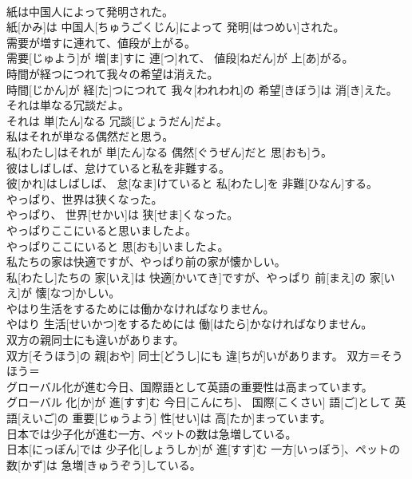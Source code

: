 \documentclass[8pt]{extreport}
\begin{document}
\begin{CJK}{UTF8}{min}
\\	紙は中国人によって発明された。	
\\	紙[かみ]は 中国人[ちゅうごくじん]によって 発明[はつめい]された。	
\\	需要が増すに連れて、値段が上がる。	
\\	需要[じゅよう]が 増[ま]すに 連[つ]れて、 値段[ねだん]が 上[あ]がる。	
\\	時間が経つにつれて我々の希望は消えた。	
\\	時間[じかん]が 経[た]つにつれて 我々[われわれ]の 希望[きぼう]は 消[き]えた。	
\\	それは単なる冗談だよ。	
\\	それは 単[たん]なる 冗談[じょうだん]だよ。	
\\	私はそれが単なる偶然だと思う。	
\\	私[わたし]はそれが 単[たん]なる 偶然[ぐうぜん]だと 思[おも]う。	
\\	彼はしばしば、怠けていると私を非難する。	
\\	彼[かれ]はしばしば、 怠[なま]けていると 私[わたし]を 非難[ひなん]する。	
\\	やっぱり、世界は狭くなった。	
\\	やっぱり、 世界[せかい]は 狭[せま]くなった。	
\\	やっぱりここにいると思いましたよ。	
\\	やっぱりここにいると 思[おも]いましたよ。	
\\	私たちの家は快適ですが、やっぱり前の家が懐かしい。	
\\	私[わたし]たちの 家[いえ]は 快適[かいてき]ですが、やっぱり 前[まえ]の 家[いえ]が 懐[なつ]かしい。	
\\	やはり生活をするためには働かなければなりません。	
\\	やはり 生活[せいかつ]をするためには 働[はたら]かなければなりません。	
\\	双方の親同士にも違いがあります。	
\\	双方[そうほう]の 親[おや] 同士[どうし]にも 違[ちが]いがあります。	双方＝そうほう＝ 
\\	グローバル化が進む今日、国際語として英語の重要性は高まっています。	
\\	グローバル 化[か]が 進[すす]む 今日[こんにち]、 国際[こくさい] 語[ご]として 英語[えいご]の 重要[じゅうよう] 性[せい]は 高[たか]まっています。	
\\	日本では少子化が進む一方、ペットの数は急増している。	
\\	日本[にっぽん]では 少子化[しょうしか]が 進[すす]む 一方[いっぽう]、ペットの 数[かず]は 急増[きゅうぞう]している。	

\end{CJK}
\end{document}
